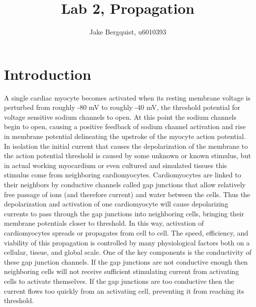 \documentclass[12pt]{article}
\begin{document}
\title{Lab 2, Propagation}
\author{Jake Bergquist, u6010393}
\maketitle
\tableofcontents
\newpage

\section{Introduction}
A single cardiac myocyte becomes activated when its resting membrane voltage is perturbed from roughly -80 mV to roughly -40 mV, the threshold potential for voltage sensitive sodium channels to open. At this point the sodium channels begin to open, causing a positive feedback of sodium channel activation and rise in membrane potential delineating the upstroke of the myocyte action potential. In isolation the initial current that causes the depolarization of the membrane to the action potential threshold is caused by some unknown or known stimulus, but in actual working myocardium or even cultured and simulated tissues this stimulus come from neighboring cardiomyocytes. Cardiomyocytes are linked to their neighbors by conductive channels called gap junctions that allow relatively free passage of ions (and therefore current) and water between the cells. Thus the depolarization and activation of one cardiomyocyte will cause depolarizing currents to pass through the gap junctions into neighboring cells, bringing their membrane potentials closer to threshold. In this way, activation of cardiomyocytes spreads or propagates from cell to cell. The speed, efficiency, and viability of this propagation is controlled by many physiological factors both on a cellular, tissue, and global scale.\cite{KLEBER2004} One of the key components is the conductivity of these gap junction channels. If the gap junctions are not conductive enough then neighboring cells will not receive sufficient stimulating current from activating cells to activate themselves. If the gap junctions are too conductive then the current flows too quickly from an activating cell, preventing it from reaching its threshold.
\end{document}
